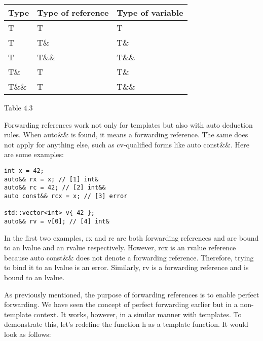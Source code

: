 \begin{table}[H]
\centering
	\begin{tabular}{|l|l|l|}
		\hline
		\textbf{Type} & \textbf{Type of reference} & \textbf{Type of variable} \\ \hline
		T             & T                          & T                         \\ \hline
		T             & T\&                        & T\&                       \\ \hline
		T             & T\&\&                      & T\&\&                     \\ \hline
		T\&           & T                          & T\&                       \\ \hline
		T\&\&         & T                          & T\&\&                     \\ \hline
	\end{tabular}
\end{table}

\begin{center}
	Table 4.3
\end{center}

Forwarding references work not only for templates but also with auto deduction rules. When auto\&\& is found, it means a forwarding reference. The same does not apply for anything else, such as cv-qualified forms like auto const\&\&. Here are some examples:

\begin{lstlisting}[style=styleCXX]
int x = 42;
auto&& rx = x; // [1] int&
auto&& rc = 42; // [2] int&&
auto const&& rcx = x; // [3] error

std::vector<int> v{ 42 };
auto&& rv = v[0]; // [4] int&
\end{lstlisting}

In the first two examples, rx and rc are both forwarding references and are bound to an lvalue and an rvalue respectively. However, rcx is an rvalue reference because auto const\&\& does not denote a forwarding reference. Therefore, trying to bind it to an lvalue is an error. Similarly, rv is a forwarding reference and is bound to an lvalue.

As previously mentioned, the purpose of forwarding references is to enable perfect forwarding. We have seen the concept of perfect forwarding earlier but in a non-template context. It works, however, in a similar manner with templates. To demonstrate this, let’s redefine the function h as a template function. It would look as follows:

